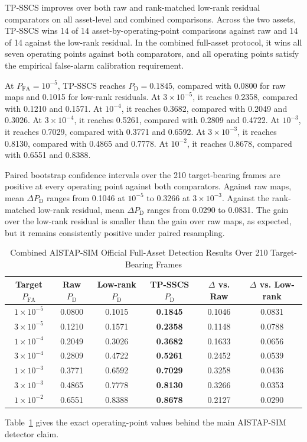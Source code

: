 \documentclass[journal]{IEEEtran}
\begin{document}
TP-SSCS improves over both raw and rank-matched low-rank residual comparators on all asset-level and combined comparisons. Across the two assets, TP-SSCS wins 14 of 14 asset-by-operating-point comparisons against raw and 14 of 14 against the low-rank residual. In the combined full-asset protocol, it wins all seven operating points against both comparators, and all operating points satisfy the empirical false-alarm calibration requirement.

At $P_{\mathrm{FA}}=10^{-5}$, TP-SSCS reaches $P_{\mathrm{D}}=0.1845$, compared with 0.0800 for raw maps and 0.1015 for low-rank residuals. At $3 \times 10^{-5}$, it reaches 0.2358, compared with 0.1210 and 0.1571. At $10^{-4}$, it reaches 0.3682, compared with 0.2049 and 0.3026. At $3 \times 10^{-4}$, it reaches 0.5261, compared with 0.2809 and 0.4722. At $10^{-3}$, it reaches 0.7029, compared with 0.3771 and 0.6592. At $3 \times 10^{-3}$, it reaches 0.8130, compared with 0.4865 and 0.7778. At $10^{-2}$, it reaches 0.8678, compared with 0.6551 and 0.8388.

Paired bootstrap confidence intervals over the 210 target-bearing frames are positive at every operating point against both comparators. Against raw maps, mean $\Delta P_{\mathrm{D}}$ ranges from 0.1046 at $10^{-5}$ to 0.3266 at $3 \times 10^{-3}$. Against the rank-matched low-rank residual, mean $\Delta P_{\mathrm{D}}$ ranges from 0.0290 to 0.0831. The gain over the low-rank residual is smaller than the gain over raw maps, as expected, but it remains consistently positive under paired resampling.

\begin{table}[!t]
\caption{Combined AISTAP-SIM Official Full-Asset Detection Results Over 210 Target-Bearing Frames}
\label{tab:aistap-full-asset-results}
\centering
\footnotesize
\renewcommand{\arraystretch}{1.12}
\begin{tabular}{@{}cccccc@{}}
\toprule
Target $P_{\mathrm{FA}}$ & Raw $P_{\mathrm{D}}$ & Low-rank $P_{\mathrm{D}}$ & TP-SSCS $P_{\mathrm{D}}$ & $\Delta$ vs. Raw & $\Delta$ vs. Low-rank \\
\midrule
$1{\times}10^{-5}$ & 0.0800 & 0.1015 & \textbf{0.1845} & 0.1046 & 0.0831 \\
$3{\times}10^{-5}$ & 0.1210 & 0.1571 & \textbf{0.2358} & 0.1148 & 0.0788 \\
$1{\times}10^{-4}$ & 0.2049 & 0.3026 & \textbf{0.3682} & 0.1633 & 0.0656 \\
$3{\times}10^{-4}$ & 0.2809 & 0.4722 & \textbf{0.5261} & 0.2452 & 0.0539 \\
$1{\times}10^{-3}$ & 0.3771 & 0.6592 & \textbf{0.7029} & 0.3258 & 0.0436 \\
$3{\times}10^{-3}$ & 0.4865 & 0.7778 & \textbf{0.8130} & 0.3266 & 0.0353 \\
$1{\times}10^{-2}$ & 0.6551 & 0.8388 & \textbf{0.8678} & 0.2127 & 0.0290 \\
\bottomrule
\end{tabular}
\vspace{0.35em}
\parbox{0.94\textwidth}{\scriptsize Table~\ref{tab:aistap-full-asset-results} gives the exact operating-point values behind the main AISTAP-SIM detector claim.}
\end{table}
\end{document}
